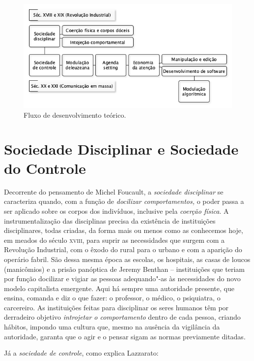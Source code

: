 \begin{figure}[!ht]
\includegraphics[width=\textwidth]{./imgs/GRAFICO_1.png}
\caption{\formular\footnotesize{Fluxo de desenvolvimento teórico.}}
\end{figure}

\section{Sociedade Disciplinar e Sociedade do Controle}

Decorrente do pensamento de Michel Foucault, a \textit{sociedade
disciplinar} se caracteriza quando, com a função de \textit{docilizar
comportamentos,} o poder passa a ser aplicado sobre os corpos dos
indivíduos, inclusive pela \textit{coerção física}. A instrumentalização
das disciplinas precisa da existência de instituições disciplinares,
todas criadas, da forma mais ou menos como as conhecemos hoje, em meados
do século \textsc{xviii}, para suprir as necessidades que surgem com a Revolução
Industrial, com o êxodo do rural para o urbano e com a aparição do
operário fabril. São dessa mesma época as escolas, os hospitais, as
casas de loucos (manicômios) e a prisão panóptica de Jeremy Benthan --
instituições que teriam por função docilizar e vigiar as pessoas
adequando"-as às necessidades do novo modelo capitalista emergente. Aqui
há sempre uma autoridade presente, que ensina, comanda e diz o que
fazer: o professor, o médico, o psiquiatra, o carcereiro. As
instituições feitas para disciplinar os seres humanos têm por derradeiro
objetivo \textit{introjetar o comportamento} dentro de cada pessoa,
criando hábitos, impondo uma cultura que, mesmo na ausência da
vigilância da autoridade, garanta que o agir e o pensar sigam as normas
previamente ditadas.

Já a \textit{sociedade de controle}, como explica Lazzarato:

